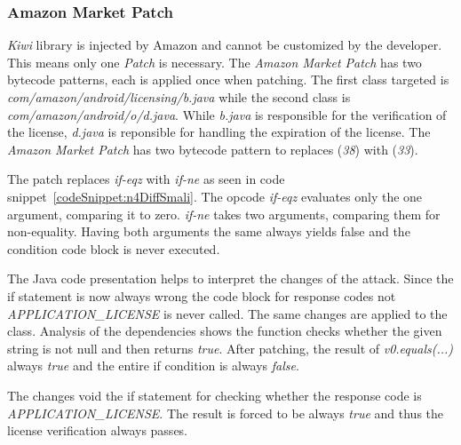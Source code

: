 \subsubsection{Amazon Market Patch}
\textit{Kiwi} library is injected by Amazon and cannot be customized by the developer.
This means only one \textit{Patch} is necessary.
The \textit{Amazon Market Patch} has two bytecode patterns, each is applied once when patching.
The first class targeted is \textit{com/amazon/android/licensing/b.java} while the second class is \textit{com/amazon/android/o/d.java}.
While \textit{b.java} is responsible for the verification of the license, \textit{d.java} is reponsible for handling the expiration of the license.
\newline
The \textit{Amazon Market Patch} has two bytecode pattern to replaces (\textit{38}) with (\textit{33}).
\newline

The patch replaces \textit{if-eqz} with \textit{if-ne} as seen in code snippet~\ref{codeSnippet:n4DiffSmali}.
The opcode \textit{if-eqz} evaluates only the one argument, comparing it to zero.
\textit{if-ne} takes two arguments, comparing them for non-equality.
Having both arguments the same always yields false and the condition code block is never executed.

The Java code presentation helps to interpret the changes of the attack.
Since the if statement is now always wrong the code block for response codes not \textit{APPLICATION\_LICENSE} is never called.
The same changes are applied to the  class.
Analysis of the dependencies shows the function checks whether the given string is not null and then returns \textit{true}.
After patching, the result of \textit{v0.equals(...)} always \textit{true} and the entire if condition is always \textit{false}.
\newline

The changes void the if statement for checking whether the response code is \textit{APPLICATION\_LICENSE}.
The result is forced to be always \textit{true} and thus the license verification always passes.

